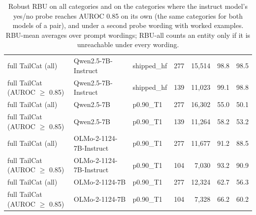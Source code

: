 \begin{table}[t]
{\begin{tabular}{lllrrrr}
full TailCat (all) & Qwen2.5-7B-Instruct & shipped\_hf & 277 & 15{,}514 & 98.8 & 98.5 \\
full TailCat (AUROC $\geq$ 0.85) & Qwen2.5-7B-Instruct & shipped\_hf & 139 & 11{,}023 & 99.1 & 98.8 \\
full TailCat (all) & Qwen2.5-7B & p0.90\_T1 & 277 & 16{,}302 & 55.0 & 50.1 \\
full TailCat (AUROC $\geq$ 0.85) & Qwen2.5-7B & p0.90\_T1 & 139 & 11{,}264 & 58.2 & 53.2 \\
full TailCat (all) & OLMo-2-1124-7B-Instruct & p0.90\_T1 & 277 & 11{,}677 & 91.2 & 88.5 \\
full TailCat (AUROC $\geq$ 0.85) & OLMo-2-1124-7B-Instruct & p0.90\_T1 & 104 & 7{,}030 & 93.2 & 90.9 \\
full TailCat (all) & OLMo-2-1124-7B & p0.90\_T1 & 277 & 12{,}324 & 62.7 & 56.3 \\
full TailCat (AUROC $\geq$ 0.85) & OLMo-2-1124-7B & p0.90\_T1 & 104 & 7{,}328 & 66.2 & 60.2 \\
\bottomrule
\end{tabular}}
\caption{Robust RBU on all categories and on the categories where the instruct model's yes/no probe reaches AUROC 0.85 on its own (the same categories for both models of a pair), and under a second probe wording with worked examples. RBU-mean averages over prompt wordings; RBU-all counts an entity only if it is unreachable under every wording.}
\label{tab:robustness}\end{table}
